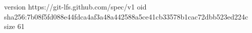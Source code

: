 version https://git-lfs.github.com/spec/v1
oid sha256:7b08f5fd088e44fdca4af3a48a442588a5ce41cb33578b1cac72dbb523ed224c
size 61
